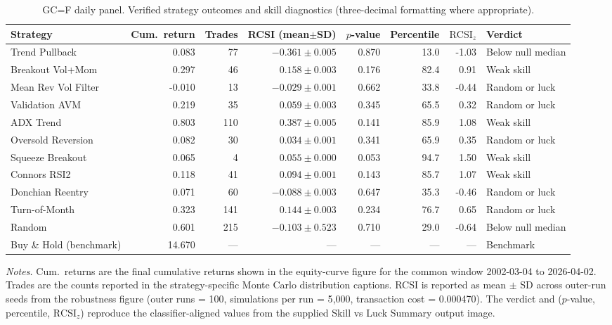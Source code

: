 \begin{table}[p]
\centering
\caption{GC=F daily panel. Verified strategy outcomes and skill diagnostics (three-decimal formatting where appropriate).}
\label{tab:main}
{\small
\renewcommand{\arraystretch}{1.15}
\setlength{\tabcolsep}{5pt}
\begin{adjustbox}{max width=\textwidth}
\begin{tabular}{@{}lrrrrrrl@{}}
\toprule
Strategy & Cum.\ return & Trades & RCSI (mean$\pm$SD) & $p$-value & Percentile & $\mathrm{RCSI}_z$ & Verdict \\
\midrule
Trend Pullback      & 0.083 &  77 & $-0.361\pm0.005$ & 0.870 & 13.0 & -1.03 & Below null median \\
Breakout Vol+Mom    & 0.297 &  46 & $\phantom{-}0.158\pm0.003$ & 0.176 & 82.4 & \phantom{-}0.91 & Weak skill \\
Mean Rev Vol Filter & -0.010 & 13 & $-0.029\pm0.001$ & 0.662 & 33.8 & -0.44 & Random or luck \\
Validation AVM      & 0.219 &  35 & $\phantom{-}0.059\pm0.003$ & 0.345 & 65.5 & \phantom{-}0.32 & Random or luck \\
ADX Trend           & 0.803 & 110 & $\phantom{-}0.387\pm0.005$ & 0.141 & 85.9 & \phantom{-}1.08 & Weak skill \\
Oversold Reversion  & 0.082 &  30 & $\phantom{-}0.034\pm0.001$ & 0.341 & 65.9 & \phantom{-}0.35 & Random or luck \\
Squeeze Breakout    & 0.065 &   4 & $\phantom{-}0.055\pm0.000$ & 0.053 & 94.7 & \phantom{-}1.50 & Weak skill \\
Connors RSI2        & 0.118 &  41 & $\phantom{-}0.094\pm0.001$ & 0.143 & 85.7 & \phantom{-}1.07 & Weak skill \\
Donchian Reentry    & 0.071 &  60 & $-0.088\pm0.003$ & 0.647 & 35.3 & -0.46 & Random or luck \\
Turn-of-Month       & 0.323 & 141 & $\phantom{-}0.144\pm0.003$ & 0.234 & 76.7 & \phantom{-}0.65 & Random or luck \\
Random              & 0.601 & 215 & $-0.103\pm0.523$ & 0.710 & 29.0 & -0.64 & Below null median \\
\midrule
Buy \& Hold (benchmark) & 14.670 & --- & --- & --- & --- & --- & Benchmark \\
\bottomrule
\end{tabular}
\end{adjustbox}
}
\par\vspace{0.75em}
\begin{minipage}{0.95\textwidth}
\centering
\footnotesize\emph{Notes.} Cum.\ returns are the final cumulative returns shown in the equity-curve figure for the common window 2002-03-04 to 2026-04-02. Trades are the counts reported in the strategy-specific Monte Carlo distribution captions. RCSI is reported as mean $\pm$ SD across outer-run seeds from the robustness figure (outer runs = 100, simulations per run = 5{,}000, transaction cost = 0.000470). The verdict and ($p$-value, percentile, $\mathrm{RCSI}_z$) reproduce the classifier-aligned values from the supplied Skill vs Luck Summary output image.
\end{minipage}
\end{table}

